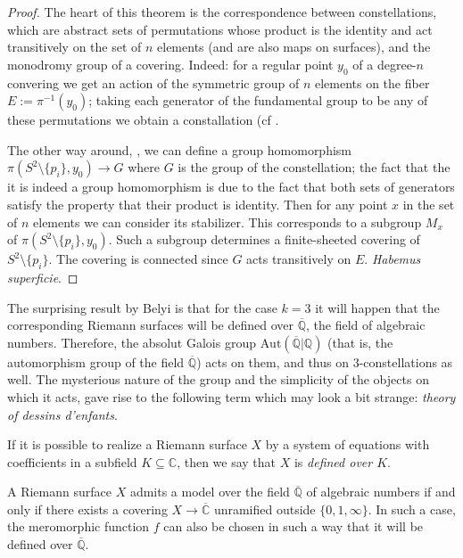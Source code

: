 \begin{proof}
The heart of this theorem is the correspondence between constellations, which
are abstract sets of permutations whose product is the identity and act
transitively on the set of $n$ elements (and are also maps on surfaces), and the
monodromy group of a covering. Indeed: for a regular point $y_0$ of a degree-$n$
convering we get an action of the symmetric group of $n$ elements on the fiber
$E:=\pi^{-1}(y_0)$; taking each generator of the fundamental group to be any of
these permutations we obtain a constallation (cf \cite[Construction
1.2.13]{lando}.

The other way around, \cite[Proposition 1.2.15]{lando}, we can define a group
homomorphism $\pi(S^2\setminus\{p_i\},y_0)\to G$ where $G$ is the group of the
constellation; the fact that the it is indeed a group homomorphism is due to the
fact that both sets of generators satisfy the property that their product is
identity. Then for any point $x$ in the set of $n$ elements we can consider its
stabilizer. This corresponds to a subgroup $M_x$ of
$\pi(S^2\setminus\{p_i\},y_0)$. Such a subgroup determines a finite-sheeted
covering of $S^2\setminus\{p_i\}$. The covering is connected since $G$ acts
transitively on $E$. {\it Habemus superficie}.
\end{proof}

The surprising result by Belyi is that for the case $k=3$ it will happen that
the corresponding Riemann surfaces will be defined over $\overline{\mathbb{Q}}$,
the field of algebraic numbers. Therefore, the absolut Galois group
$\text{Aut}(\overline{\mathbb{Q}}|\mathbb{Q})$ (that is, the automorphism group
of the field $\overline{\mathbb{Q}}$) acts on them, and thus on
$3$-constellations as well. The mysterious nature of the group and the
simplicity of the objects on which it acts, gave rise to the following term
which may look a bit strange: {\it theory of dessins d'enfants}.

\begin{definition}
\label{definition-Riemann-surface-defined-over-field}
\begin{reference}
\cite[Definition 1.8.8]{lando}
\end{reference}
If it is possible to realize a Riemann surface $X$ by a system of equations with
coefficients in a subfield $K\subseteq\mathbb{C}$, then we say that $X$ is {\it
defined over $K$}.
\end{definition}

\begin{theorem}[Belyi]
\label{theorem-Belyi}
\begin{reference}
\cite[Theorem 2.1.1]{lando}
\end{reference}
A Riemann surface $X$ admits a model over the field $\overline{ \mathbb{Q}}$ of
algebraic numbers if and only if there exists a covering $X\to \overline{
\mathbb{C}}$ unramified outside $\{0,1,\infty\}$. In such a case, the
meromorphic function $f$ can also be chosen in such a way that it will be
defined over $\overline{\mathbb{Q}}$.
\end{theorem}

